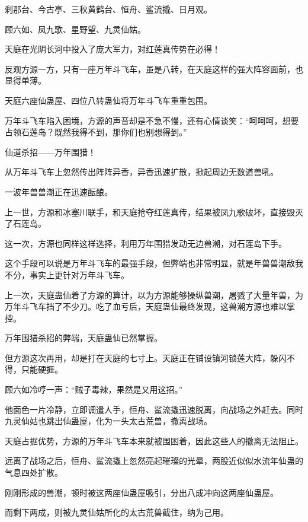
\begin{this_body}



刹那台、今古亭、三秋黄鹤台、恒舟、鲨流撬、日月观。

顾六如、凤九歌、星野望、九灵仙姑。

天庭在光阴长河中投入了庞大军力，对红莲真传势在必得！

反观方源一方，只有一座万年斗飞车，虽是八转，在天庭这样的强大阵容面前，也显得单薄。

天庭六座仙蛊屋、四位八转蛊仙将万年斗飞车重重包围。

万年斗飞车陷入困境，方源的声音却是不急不慢，还有心情谈笑：“呵呵呵，想要占领石莲岛？既然我得不到，那你们也别想得到。”

仙道杀招——万年围猎！

从万年斗飞车上忽然传出阵阵异香，异香迅速扩散，掀起周边无数道兽吼。

一波年兽兽潮正在迅速酝酿。

上一世，方源和冰塞川联手，和天庭抢夺红莲真传，结果被凤九歌破坏，直接毁灭了石莲岛。

这一次，方源也同样这样选择，利用万年围猎发动无边兽潮，对石莲岛下手。

这个手段可以说是万年斗飞车的最强手段，但弊端也非常明显，就是年兽兽潮敌我不分，事实上更针对万年斗飞车。

上一次，天庭蛊仙着了方源的算计，以为方源能够操纵兽潮，屠戮了大量年兽，为万年斗飞车挡了不少刀。吃了血亏后，天庭蛊仙最终发现，这兽潮方源也难以掌控。

万年围猎杀招的弊端，天庭蛊仙已然掌握。

但方源这次再用，却是打在天庭的七寸上。天庭正在铺设镇河锁莲大阵，躲闪不得，只能硬捱。

顾六如冷哼一声：“贼子毒辣，果然是又用这招。”

他面色一片冷静，立即调遣人手，恒舟、鲨流撬迅速脱离，向战场之外赶去。同时九灵仙姑也跳出仙蛊屋，化为一头太古荒兽，撤离战场。

天庭占据优势，方源的万年斗飞车本来就被围困着，因此这些人的撤离无法阻止。

远离了战场之后，恒舟、鲨流撬上忽然亮起璀璨的光晕，两股近似似水流年仙蛊的气息四处扩散。

刚刚形成的兽潮，顿时被这两座仙蛊屋吸引，分出八成冲向这两座仙蛊屋。

而剩下两成，则被九灵仙姑所化的太古荒兽截住，纳为己用。


\end{this_body}
